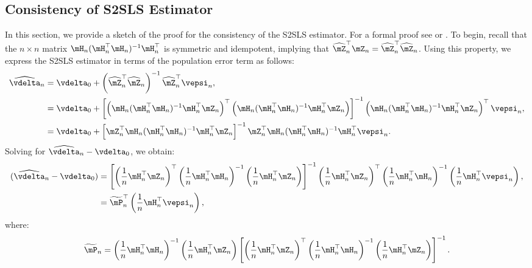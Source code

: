 \documentclass[english,12pt]{book}\usepackage[]{graphicx}\usepackage[]{xcolor}
\begin{document}
\subsection{Consistency of S2SLS Estimator}

In this section, we provide a sketch of the proof for the consistency of the S2SLS estimator. For a formal proof see \cite{kelejian1998generalized} or \cite{kelejian2010specification}. To begin, recall that the $n\times n$ matrix  $\mH_n(\mH_n^\top\mH_n)^{-1}\mH_n^\top$ is symmetric and idempotent, implying that $\widehat{\mZ}_n^\top\mZ_n= \widehat{\mZ}_n^\top\widehat{\mZ}_n$. Using this property, we express the S2SLS estimator in terms of the population error term as follows: 
\begin{equation}\label{eq:sampling_error_s2sls}
  \begin{aligned}
     \widehat{\vdelta}_n & =  \vdelta_0 + \left(\widehat{\mZ}^\top_n\widehat{\mZ}_n\right)^{-1}\widehat{\mZ}^\top_n\vepsi_n, \\
     & = \vdelta_0 + \left[\left(\mH_n(\mH^\top_n\mH_n)^{-1}\mH^\top_n\mZ_n\right)^\top\left(\mH_n(\mH^\top_n\mH_n)^{-1}\mH^\top_n\mZ_n\right)\right]^{-1}\left(\mH_n(\mH^\top_n\mH_n)^{-1}\mH^\top_n\mZ_n\right)^\top\vepsi_n, \\
     & = \vdelta_0 + \left[\mZ^\top_n \mH_n (\mH^\top_n\mH_n)^{-1}\mH^\top_n\mZ_n\right]^{-1}\mZ^\top_n\mH_n(\mH^\top_n\mH_n)^{-1}\mH^\top_n\vepsi_n.
  \end{aligned}
\end{equation}
%
Solving for $\widehat{\vdelta}_{n} - \vdelta_0$, we obtain:
\begin{equation}\label{eq:asy_2sls_pr}
\begin{aligned}
(\widehat{\vdelta}_{n} - \vdelta_0) & = \left[\left(\frac{1}{n}\mH^\top_n\mZ _n\right)^\top\left(\frac{1}{n}\mH^\top_n\mH_n\right)^{-1}\left(\frac{1}{n}\mH^\top_n\mZ_n\right)\right]^{-1}\left(\frac{1}{n}\mH^\top_n\mZ_n\right)^\top\left(\frac{1}{n}\mH^\top_n\mH_n\right)^{-1}\left(\frac{1}{n}\mH^\top_n\vepsi_n\right), \\
             & = \widetilde{\mP}^\top_n\left(\frac{1}{n}\mH^\top_n\vepsi_n\right),
\end{aligned}
\end{equation}
where:
\begin{equation*}
  \widetilde{\mP}_n = \left(\frac{1}{n}\mH^\top_n\mH_n\right)^{-1}\left(\frac{1}{n}\mH_n^\top\mZ_n \right)\left[\left(\frac{1}{n}\mH^\top_n\mZ_n\right)^\top\left(\frac{1}{n}\mH^\top_n\mH_n\right)^{-1}\left(\frac{1}{n}\mH^\top_n\mZ_n\right)\right]^{-1}.
\end{equation*}
\end{document}
